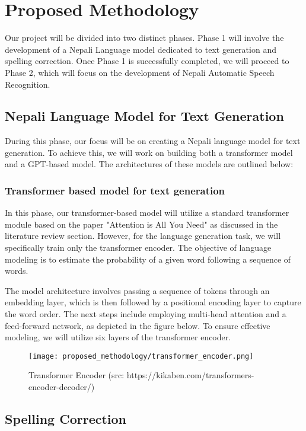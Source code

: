 \chapter{Proposed Methodology}
Our project will be divided into two distinct phases. Phase 1 will involve the development of a Nepali Language model dedicated to text generation and spelling correction. Once Phase 1 is successfully completed, we will proceed to Phase 2, which will focus on the development of Nepali Automatic Speech Recognition.

\section{Nepali Language Model for Text Generation}
During this phase, our focus will be on creating a Nepali language model for text generation. To achieve this, we will work on building both a transformer model and a GPT-based model. The architectures of these models are outlined below:

\subsection{Transformer based model for text generation}
In this phase, our transformer-based model will utilize a standard transformer module based on the paper "Attention is All You Need" \cite{NIPS2017_3f5ee243} as discussed in the literature review section. However, for the language generation task, we will specifically train only the transformer encoder. The objective of language modeling is to estimate the probability of a given word following a sequence of words.

The model architecture involves passing a sequence of tokens through an embedding layer, which is then followed by a positional encoding layer to capture the word order. The next steps include employing multi-head attention and a feed-forward network, as depicted in the figure below. To ensure effective modeling, we will utilize six layers of the transformer encoder.

\begin{figure}[H]
    \centering
    \texttt{[image: proposed\_methodology/transformer\_encoder.png]}
    \caption{Transformer Encoder (src: https://kikaben.com/transformers-encoder-decoder/)}
    \label{fig:Transformer Encoder (src: https://kikaben.com/transformers-encoder-decoder/)}
\end{figure}

\section{Spelling Correction}

